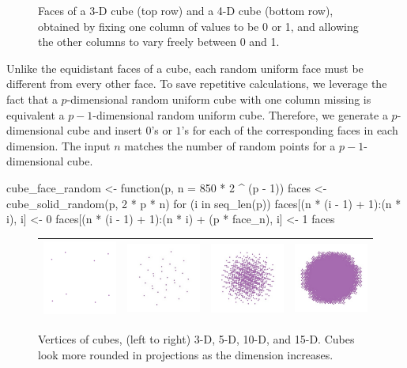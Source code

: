 \begin{itemize}
\begin{figure}[ht]
    \caption{Faces of a 3-D cube (top row) and a 4-D cube (bottom row), obtained by fixing one column of values to be 0 or 1, and allowing the other columns to vary freely between 0 and 1.}
    \label{faces}
  \end{figure}

  Unlike the equidistant faces of a cube, each random uniform face must be different from every other face.  To save repetitive calculations, we leverage the fact that a $p$-dimensional random uniform cube with one column missing is equivalent a $p-1$-dimensional random uniform cube.  Therefore, we generate a $p$-dimensional cube and insert $0$'s or $1$'s for each of the corresponding faces in each dimension.  The input $n$ matches the number of random points for a $p-1$-dimensional cube.

\begin{example}
cube_face_random <- function(p, n = 850 * 2 ^ (p - 1)) {
  faces <- cube_solid_random(p, 2 * p * n)
  for (i in seq_len(p)) {
    faces[(n * (i - 1) + 1):(n * i), i] <- 0
    faces[(n * (i - 1) + 1):(n * i) + (p * face_n), i] <- 1
  }
  faces
}
\end{example}

\end{itemize}

\begin{figure}[ht]
\centering
\begin{tabular}{|c|c|c|c|}
\hline
\includegraphics[width=1in]{fig/cube-3-vert.pdf} & \includegraphics[width=1in]{fig/cube-5-vert.pdf} &
\includegraphics[width=1in]{fig/cube-10-vert.pdf} & \includegraphics[width=1in]{fig/cube-15-vert.pdf} \\
\hline
\end{tabular}
\caption{Vertices of cubes, (left to right) 3-D, 5-D, 10-D, and 15-D. Cubes look more
  rounded in projections as the dimension increases.}
\end{figure}



